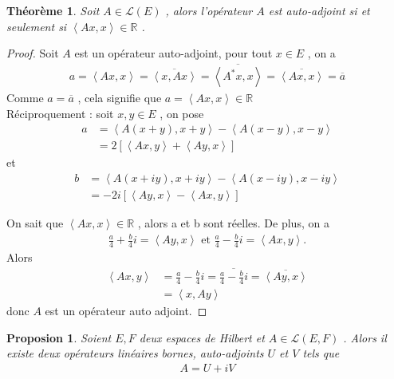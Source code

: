 \documentclass{report}
\newtheorem{The}{Théorème}[subsection]
\newtheorem{Prop}{Proposion}[subsection]
\begin{document}
{\begin{The}Soit $A \in \mathscr{L}(E)$ , alors l'opérateur $A$ est auto-adjoint si et seulement si $\left< Ax,x \right> \in \mathbb{R}$ .\\
\end{The}
\begin{proof}
Soit $A$ est un opérateur auto-adjoint, pour tout $x \in E$ , on a 
					\begin{align*}
					 a = \left< Ax,x \right> = \overline{\left< x,Ax \right>} = \overline{\left< A^*x,x \right>} = \overline{\left< Ax,x \right>} = \overline{a}
					\end{align*}
Comme $a = \overline{a}$ , cela signifie que $a = \left< Ax,x \right> \in \mathbb{R}$ \\
Réciproquement : soit $x,y \in E$ , on pose 
					\begin{align*}
					 a &= \left< A(x+y),x+y \right> - \left< A(x-y),x-y \right> \\
					   &= 2[\left< Ax,y \right> + \left< Ay,x \right>] 
					\end{align*}
et					 
					 \begin{align*}
					 b &= \left< A(x+iy),x+iy \right> - \left< A(x-iy),x-iy \right> \\
					   &= -2i [\left< Ay,x \right> - \left< Ax,y \right>]
					 \end{align*}



On sait que $\left< Ax,x \right> \in \mathbb{R}$ , alors a et b sont réelles. De plus, on a 
					\begin{align*} \frac{a}{4} + \frac{b}{4} i = \left< Ay,x \right> \,\, \text{et} \,\, \frac{a}{4} - \frac{b}{4} i = \left< Ax,y \right> .
					\end{align*}
Alors 
					\begin{align*} 
					\left< Ax,y \right> &= \frac{a}{4} - \frac{b}{4}i = \overline{\frac{a}{4} - \frac{b}{4}i} = \overline{\left< Ay,x \right>}\\
					 &= \left< x,Ay \right>
					\end{align*} 
donc $A$ est un opérateur auto adjoint.
\end{proof}



\begin{Prop}Soient $E, F$ deux espaces de Hilbert et $A \in \mathscr{L}(E,F)$ . Alors il existe deux opérateurs linéaires bornes, auto-adjoints $U$ et $V$ tels que 
					\begin{align*} 
					  A = U + iV 
					\end{align*}


\end{Prop}}
\end{document}
